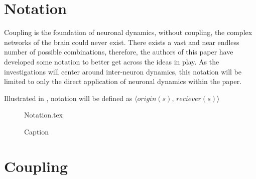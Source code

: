 \documentclass[class={myRUCProject}, crop=false]{standalone}
\begin{document}
\section{Notation}


Coupling is the foundation of neuronal dynamics, without coupling, the complex networks of the brain could never exist. There exists a vast and near endless number of possible combinations, therefore, the authors of this paper have developed some notation to better get across the ideas in play.
As the investigations will center around inter-neuron dynamics, this notation will be limited to only the direct application of neuronal dynamics within the paper.

Illustrated in , notation will be defined as \(\langle origin(s), \, reciever(s)\rangle\)
\begin{figure}[h]
    \centering
    {Notation.tex}
    \caption{Caption}\label{fig:notation}
\end{figure}


\section{Coupling}







\end{document}
